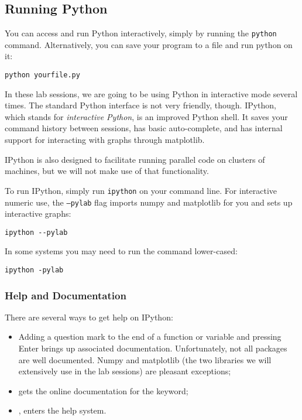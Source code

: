 \subsection{Running Python}

You can access and run Python interactively, simply by running the
\texttt{python} command. Alternatively, you can save your program to a file
and run python on it:

\begin{verbatim}
python yourfile.py
\end{verbatim}

In these lab sessions, we are going to be using Python in interactive mode
several times. The standard Python interface is not very friendly, though.
IPython, which stands for \emph{interactive Python}, is an improved Python
shell. It saves your command history between sessions, has basic auto-complete,
and has internal support for interacting with graphs through matplotlib.

IPython is also designed to facilitate running parallel code on clusters of
machines, but we will not make use of that functionality.

To run IPython, simply run \texttt{ipython} on your command line. For
interactive numeric use, the \texttt{--pylab} flag imports numpy and matplotlib
for you and sets up interactive graphs:

\begin{verbatim}
ipython --pylab
\end{verbatim}

In some systems you may need to run the command lower-cased:

\begin{verbatim}
ipython -pylab
\end{verbatim}

\subsubsection{Help and Documentation}

There are several ways to get help on IPython:

\begin{itemize}
\item Adding a question mark to the end of a function or variable and pressing Enter brings up associated documentation. Unfortunately, not all packages are well documented. Numpy and matplotlib (the two libraries we will extensively use in the lab sessions) are pleasant exceptions;
\item {} gets the online documentation for the  keyword;
\item {}, enters the help system.
\end{itemize}

